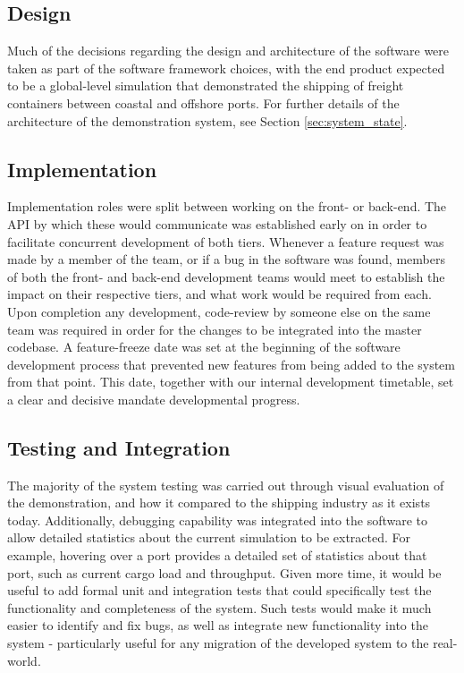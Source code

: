 \subsection{Design}

Much of the decisions regarding the design and architecture of the software were taken as part of the software framework choices, with the end product expected to be a global-level simulation that demonstrated the shipping of freight containers between coastal and offshore ports. For further details of the architecture of the demonstration system, see Section \ref{sec:system_state}.

\subsection{Implementation}

Implementation roles were split between working on the front- or back-end. The API by which these would communicate was established early on in order to facilitate concurrent development of both tiers. Whenever a feature request was made by a member of the team, or if a bug in the software was found, members of both the front- and back-end development teams would meet to establish the impact on their respective tiers, and what work would be required from each. Upon completion any development, code-review by someone else on the same team was required in order for the changes to be integrated into the master codebase. A feature-freeze date was set at the beginning of the software development process that prevented new features from being added to the system from that point. This date, together with our internal development timetable, set a clear and decisive mandate developmental progress.

\subsection{Testing and Integration}

The majority of the system testing was carried out through visual evaluation of the demonstration, and how it compared to the shipping industry as it exists today. Additionally, debugging capability was integrated into the software to allow detailed statistics about the current simulation to be extracted. For example, hovering over a port provides a detailed set of statistics about that port, such as current cargo load and throughput. Given more time, it would be useful to add formal unit and integration tests that could specifically test the functionality and completeness of the system. Such tests would make it much easier to identify and fix bugs, as well as integrate new functionality into the system - particularly useful for any migration of the developed system to the real-world.
